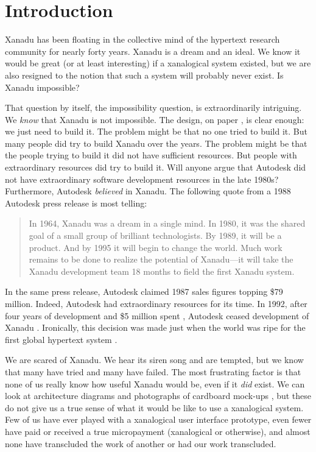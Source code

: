 \documentclass{acm_proc_article-sp}
\begin{document}
\section{Introduction}
\label{sec:Introduction}
Xanadu has been floating in the collective mind of the hypertext research community for nearly forty years.
Xanadu is a dream and an ideal.  
We know it would be great (or at least interesting) if a xanalogical system existed, but we are also resigned to the notion that such a system will probably never exist.
Is Xanadu impossible?

That question by itself, the impossibility question, is extraordinarily intriguing.  We {\it know} that Xanadu is not impossible.  
The design, on paper \cite{NelsonLiteraryMachines}, is clear enough:  we just need to build it.  
The problem might be that no one tried to build it.  
But many people did try to build Xanadu over the years.  
The problem might be that the people trying to build it did not have sufficient resources.  But people with extraordinary resources did try to build it.  
Will anyone argue that Autodesk did not have extraordinary software development resources in the late 1980s?  
Furthermore, Autodesk {\it believed} in Xanadu.  
The following quote from a 1988 Autodesk press release is most telling:

\begin{quote}
In 1964, Xanadu was a dream in a single mind.  In 1980, it was the
shared goal of a small group of brilliant technologists.  By 1989, it
will be a product.  And by 1995 it will begin to change the world.
Much work remains to be done to realize the potential of Xanadu---it
will take the Xanadu development team 18 months to field the first
Xanadu system. \cite{AutodeskPress} 
\end{quote}

In the same press release, Autodesk claimed 1987 sales figures topping \$79 million.  
Indeed, Autodesk had extraordinary resources for its time.  
In 1992, after four years of development and \$5 million spent \cite{AutodeskCost},  Autodesk ceased development of Xanadu \cite{AutodeskPressDrop}.  
Ironically, this decision was made just when the world was ripe for the first global hypertext system \cite{BernersLee92}.

We are scared of Xanadu.  
We hear its siren song and are tempted, but we know that many have tried and many have failed.  
The most frustrating factor is that none of us really know how useful Xanadu would be, even if it {\it did} exist.  
We can look at architecture diagrams and photographs of cardboard mock-ups \cite{Nelson1999}, but these do not give us a true sense of what it would be like to use a xanalogical system.  
Few of us have ever played with a xanalogical user interface prototype, even fewer have paid or received a true micropayment (xanalogical or otherwise), and almost none have transcluded the work of another or had our work transcluded.
\end{document}
